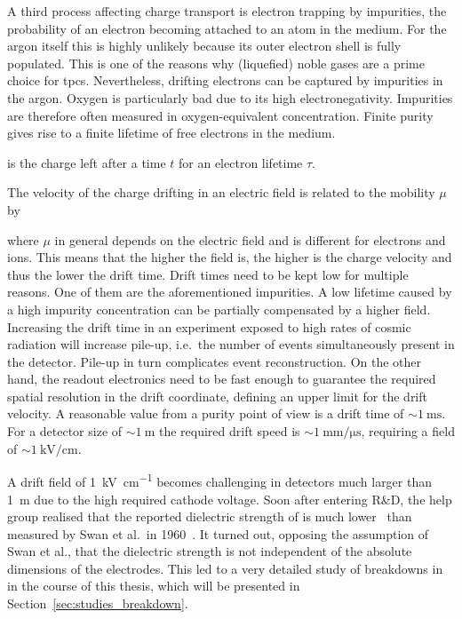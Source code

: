A third process affecting charge transport is electron trapping by impurities, the probability of an electron becoming attached to an atom in the medium.
For the argon itself this is highly unlikely because its outer electron shell is fully populated.
This is one of the reasons why (liquefied) noble gases are a prime choice for \glspl{tpc}.
Nevertheless, drifting electrons can be captured by impurities in the argon.
Oxygen is particularly bad due to its high electronegativity.
Impurities are therefore often measured in oxygen-equivalent concentration.
Finite purity gives rise to a finite lifetime of free electrons in the medium.
is the charge left after a time $t$ for an electron lifetime $\tau$.

The velocity of the charge drifting in an electric field is related to the mobility $\mu$ by
where $\mu$ in general depends on the electric field and is different for electrons and ions.
This means that the higher the field is, the higher is the charge velocity and thus the lower the drift time.
Drift times need to be kept low for multiple reasons.
One of them are the aforementioned impurities.
A low lifetime caused by a high impurity concentration can be partially compensated by a higher field.
Increasing the drift time in an experiment exposed to high rates of cosmic radiation will increase pile-up, i.e.\ the number of events simultaneously present in the detector.
Pile-up in turn complicates event reconstruction.
On the other hand, the readout electronics need to be fast enough to guarantee the required spatial resolution in the drift coordinate, defining an upper limit for the drift velocity.
A reasonable value from a purity point of view is a drift time of $\sim{\SI{1}{\milli\second}}$.
For a detector size of $\sim{\SI{1}{\metre}}$ the required drift speed is $\sim{\SI{1}{\milli\metre\per\micro\second}}$, requiring a field of $\sim{\SI{1}{\kilo\volt\per\centi\metre}}$.

A drift field of \SI{1}{\kilo\volt\per\centi\metre} becomes challenging in detectors much larger than \SI{1}{\metre} due to the high required cathode voltage.
Soon after entering \lartpc{} R\&D, the \gls{help} group realised that the reported dielectric strength of \lar{} is much lower~\cite{breakdown_14} than measured by Swan et al.\ in 1960~\cite{swan1, swan2}.
It turned out, opposing the assumption of Swan et al., that the dielectric strength is not independent of the absolute dimensions of the electrodes.
This led to a very detailed study of breakdowns in \lar{} in the course of this thesis, which will be presented in Section~\ref{sec:studies_breakdown}.


